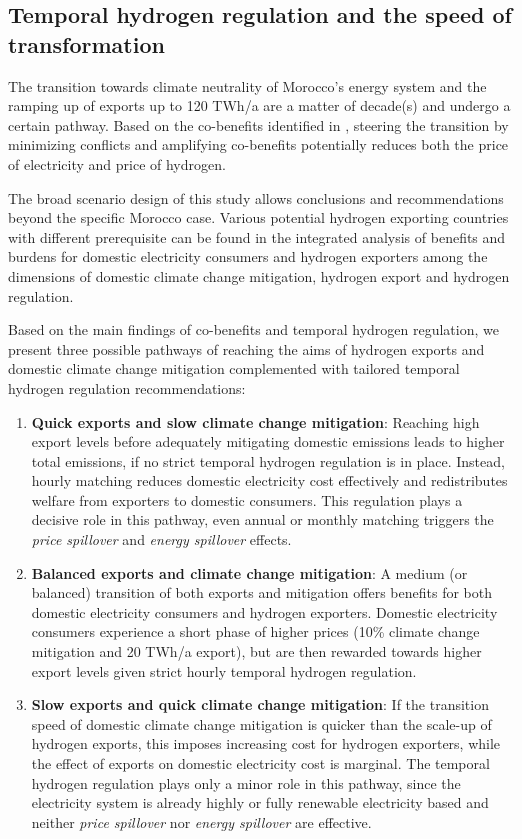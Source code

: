 \subsection*{Temporal hydrogen regulation and the speed of transformation}
\label{subsec:timepath}
The transition towards climate neutrality of Morocco's energy system and the ramping up of exports up to 120 TWh/a are a matter of decade(s) and undergo a certain pathway. Based on the co-benefits identified in , steering the transition by minimizing conflicts and amplifying co-benefits potentially reduces both the price of electricity and price of hydrogen. 

The broad scenario design of this study allows conclusions and recommendations beyond the specific Morocco case.
Various potential hydrogen exporting countries with different prerequisite can be found in the integrated analysis of benefits and burdens for domestic electricity consumers and hydrogen exporters among the dimensions of domestic climate change mitigation, hydrogen export and hydrogen regulation.

Based on the main findings of co-benefits and temporal hydrogen regulation, we present three possible pathways of reaching the aims of hydrogen exports and domestic climate change mitigation complemented with tailored temporal hydrogen regulation recommendations:
\begin{enumerate}
    \item \textbf{Quick exports and slow climate change mitigation}: Reaching high export levels before adequately mitigating domestic emissions leads to higher total emissions, if no strict temporal hydrogen regulation is in place. Instead, hourly matching reduces domestic electricity cost effectively and redistributes welfare from exporters to domestic consumers. This regulation plays a decisive role in this pathway, even annual or monthly matching triggers the \textit{price spillover} and \textit{energy spillover} effects.
    \item \textbf{Balanced exports and climate change mitigation}: A medium (or balanced) transition of both exports and mitigation offers benefits for both domestic electricity consumers and hydrogen exporters. Domestic electricity consumers experience a short phase of higher prices (10\% climate change mitigation and 20 TWh/a export), but are then rewarded towards higher export levels given strict hourly temporal hydrogen regulation.
    \item \textbf{Slow exports and quick climate change mitigation}: If the transition speed of domestic climate change mitigation is quicker than the scale-up of hydrogen exports, this imposes increasing cost for hydrogen exporters, while the effect of exports on domestic electricity cost is marginal. The temporal hydrogen regulation plays only a minor role in this pathway, since the electricity system is already highly or fully renewable electricity based and neither \textit{price spillover} nor \textit{energy spillover} are effective.
\end{enumerate}

